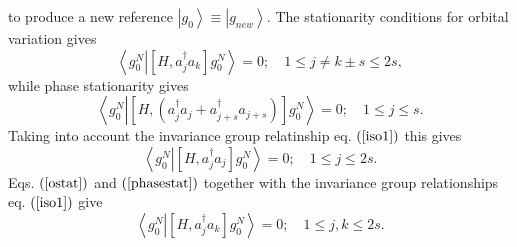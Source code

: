 \documentclass[aps,preprint]{revtex4}%
\begin{document}
to produce a new reference $\left\vert g_{0}\right\rangle \equiv\left\vert
g_{new}\right\rangle .$ The stationarity conditions for orbital variation
gives
\begin{equation}
\left\langle g_{0}^{N}\left\vert \left[  H,a_{j}^{\dagger}a_{k}\right]
g_{0}^{N}\right.  \right\rangle =0;\quad1\leq j\neq k\pm s\leq2s,
\label{ostat}%
\end{equation}
while phase stationarity gives%
\begin{equation}
\left\langle g_{0}^{N}\left\vert \left[  H,\left(  a_{j}^{\dagger}%
a_{j}+a_{j+s}^{\dagger}a_{j+s}\right)  \right]  g_{0}^{N}\right.
\right\rangle =0;\quad1\leq j\leq s.
\end{equation}
Taking into account the invariance group relatinship eq. $\left(
\ref{iso1}\right)  $ this gives
\begin{equation}
\left\langle g_{0}^{N}\left\vert \left[  H,a_{j}^{\dagger}a_{j}\right]
g_{0}^{N}\right.  \right\rangle =0;\quad1\leq j\leq2s. \label{phasestat}%
\end{equation}
Eqs. $\left(  \ref{ostat}\right)  $ and $\left(  \ref{phasestat}\right)  $
together with the invariance group relationships eq. $\left(  \ref{iso1}%
\right)  $ give
\begin{equation}
\left\langle g_{0}^{N}\left\vert \left[  H,a_{j}^{\dagger}a_{k}\right]
g_{0}^{N}\right.  \right\rangle =0;\quad1\leq j,k\leq2s. \label{orbstat}%
\end{equation}
\end{document}
